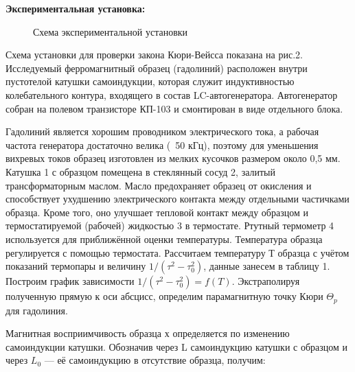 \documentclass[a4paper,12pt]{article}
\begin{document}
\par \textbf{Экспериментальная установка:}
\begin{figure}
	\centering
	\caption{Схема экспериментальной установки}
	\label{mah}

\end{figure}
\par Схема установки для проверки закона Кюри-Вейсса показана на рис.2. Исследуемый ферромагнитный образец (гадолиний) расположен внутри пустотелой катушки самоиндукции, которая служит индуктивностью колебательного контура, входящего в состав LC-автогенератора. Автогенератор собран на полевом транзисторе КП-103 и смонтирован в виде отдельного блока.
\par Гадолиний является хорошим проводником электрического тока, а рабочая частота генератора достаточно велика (~50 кГц), поэтому для уменьшения вихревых токов образец изготовлен из мелких кусочков размером около 0,5 мм. Катушка 1 с образцом помещена в стеклянный сосуд 2, залитый трансформаторным маслом. Масло предохраняет образец от окисления и способствует ухудшению электрического контакта между отдельными частичками образца. Кроме того, оно улучшает тепловой контакт между образцом и термостатируемой (рабочей) жидкостью 3 в термостате. Ртутный термометр 4 используется для приближённой оценки температуры. Температура образца регулируется с помощью термостата.
Рассчитаем температуру Т образца с учётом показаний термопары и величину $1/(\tau^2 - \tau_0^2)$, данные занесем в таблицу 1. Построим график зависимости $1/(\tau^{2} - \tau_0^2) = f(T)$. Экстраполируя полученную прямую к оси абсцисс, определим парамагнитную точку Кюри $\Theta_p$ для гадолиния.
\par Магнитная восприимчивость образца х определяется по изменению самоиндукции катушки. Обозначив через L самоиндукцию катушки с образцом и через $L_0$ — её самоиндукцию в отсутствие образца, получим:
\end{document}
